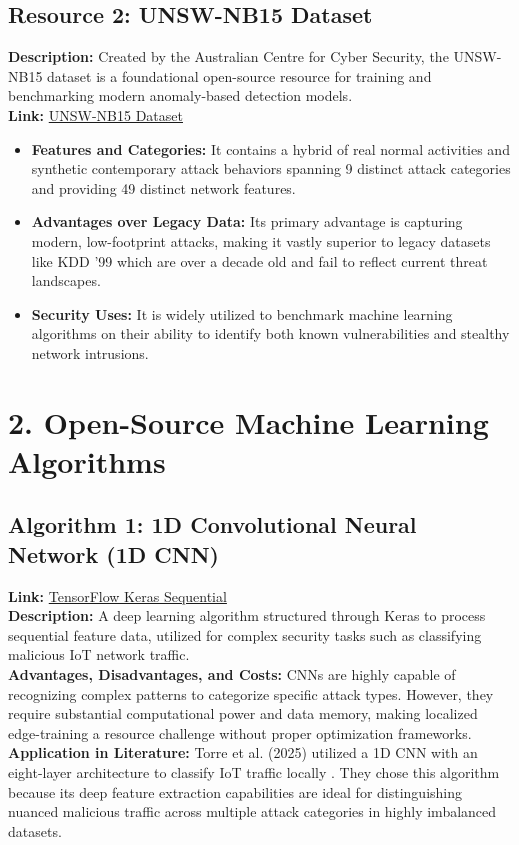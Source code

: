 \documentclass[letterpaper]{article}
\begin{document}
\subsection*{Resource 2: UNSW-NB15 Dataset}
\textbf{Description:} Created by the Australian Centre for Cyber Security, the UNSW-NB15 dataset is a foundational open-source resource for training and benchmarking modern anomaly-based detection models. \\
\textbf{Link:} \href{https://research.unsw.edu.au/projects/unsw-nb15-dataset}{UNSW-NB15 Dataset}
\begin{itemize}
    \item \textbf{Features and Categories:} It contains a hybrid of real normal activities and synthetic contemporary attack behaviors spanning 9 distinct attack categories and providing 49 distinct network features.
    \item \textbf{Advantages over Legacy Data:} Its primary advantage is capturing modern, low-footprint attacks, making it vastly superior to legacy datasets like KDD '99 which are over a decade old and fail to reflect current threat landscapes.
    \item \textbf{Security Uses:} It is widely utilized to benchmark machine learning algorithms on their ability to identify both known vulnerabilities and stealthy network intrusions.
\end{itemize}

\pagebreak
\section{2. Open-Source Machine Learning Algorithms}

\subsection*{Algorithm 1: 1D Convolutional Neural Network (1D CNN)}
\textbf{Link:} \href{https://www.tensorflow.org/api_docs/python/tf/keras/Sequential}{TensorFlow Keras Sequential} \\
\textbf{Description:} A deep learning algorithm structured through Keras to process sequential feature data, utilized for complex security tasks such as classifying malicious IoT network traffic. \\
\textbf{Advantages, Disadvantages, and Costs:} CNNs are highly capable of recognizing complex patterns to categorize specific attack types. However, they require substantial computational power and data memory, making localized edge-training a resource challenge without proper optimization frameworks. \\
\textbf{Application in Literature:} Torre et al. (2025) utilized a 1D CNN with an eight-layer architecture to classify IoT traffic locally \cite{torre2025}. They chose this algorithm because its deep feature extraction capabilities are ideal for distinguishing nuanced malicious traffic across multiple attack categories in highly imbalanced datasets.
\vspace{1em}
\end{document}
